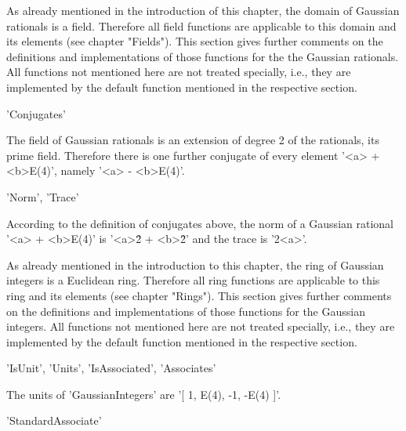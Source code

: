 As already mentioned  in the introduction of this chapter,  the domain of
Gaussian  rationals  is a  field.   Therefore  all  field  functions  are
applicable to this domain and  its elements (see chapter "Fields").  This
section gives  further comments on the definitions and implementations of
those  functions  for  the the  Gaussian  rationals.   All  functions not
mentioned here are not  treated specially, i.e., they are implemented  by
the default function mentioned in the respective section.

\vspace{5mm}
'Conjugates'

The  field  of Gaussian  rationals  is  an  extension of degree 2 of  the
rationals,  its prime field.  Therefore there is one further conjugate of
every element '<a> + <b>\*E(4)', namely '<a> - <b>\*E(4)'.

\vspace{5mm}
'Norm', 'Trace'

According to the definition  of conjugates above, the  norm of a Gaussian
rational    '<a> + <b>\*E(4)'  is  '<a>\^2  + <b>\^2'   and  the trace is
'2\*<a>'.

%
%
%
%
%
%
%
%
%

As already mentioned in  the introduction to  this chapter,  the  ring of
Gaussian integers  is a Euclidean ring.  Therefore all ring functions are
applicable to this  ring and  its  elements (see chapter "Rings").   This
section gives further comments on  the definitions and implementations of
those functions for the Gaussian integers.   All functions  not mentioned
here are not treated specially, i.e., they are implemented by the default
function mentioned in the respective section.

\vspace{5mm}
'IsUnit', 'Units', 'IsAssociated', 'Associates'

The units of 'GaussianIntegers' are '[ 1, E(4), -1, -E(4) ]'.

\vspace{5mm}
'StandardAssociate'

